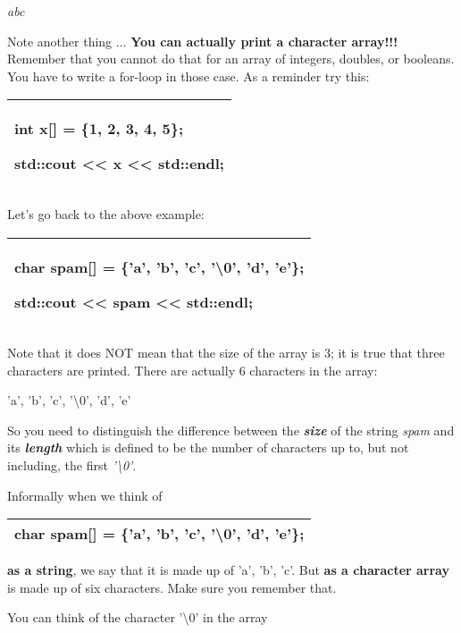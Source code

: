 \documentclass[
]{article}
\begin{document}
\emph{abc}

Note another thing ... \textbf{You can actually print a character
array!!!} Remember that you cannot do that for an array of integers,
doubles, or booleans. You have to write a for-loop in those case. As a
reminder try this:

\begin{longtable}[]{@{}l@{}}
\toprule
\endhead
\begin{minipage}[t]{0.97\columnwidth}\raggedright
int x{[}{]} = \{1, 2, 3, 4, 5\};

std::cout \textless\textless{} x \textless\textless{} std::endl;\strut
\end{minipage}\tabularnewline
\bottomrule
\end{longtable}

Let's go back to the above example:

\begin{longtable}[]{@{}l@{}}
\toprule
\endhead
\begin{minipage}[t]{0.97\columnwidth}\raggedright
char spam{[}{]} = \{'a', 'b', 'c', '\textbackslash0', 'd', 'e'\};

std::cout \textless\textless{} spam \textless\textless{}
std::endl;\strut
\end{minipage}\tabularnewline
\bottomrule
\end{longtable}

Note that it does NOT mean that the size of the array is 3; it is true
that three characters are printed. There are actually 6 characters in
the array:

'a', 'b', 'c', '\textbackslash0', 'd', 'e'

So you need to distinguish the difference between the
\emph{\textbf{size}} of the string \emph{spam} and its
\emph{\textbf{length}} which is defined to be the number of characters
up to, but not including, the first \emph{'\textbackslash0'}.

Informally when we think of

\begin{longtable}[]{@{}l@{}}
\toprule
\endhead
char spam{[}{]} = \{'a', 'b', 'c', '\textbackslash0', 'd', 'e'\};
\tabularnewline
\bottomrule
\end{longtable}

\textbf{as a string}, we say that it is made up of 'a', 'b', 'c'. But
\textbf{as a character array} is made up of six characters. Make sure
you remember that.

You can think of the character '\textbackslash0' in the array
\end{document}
